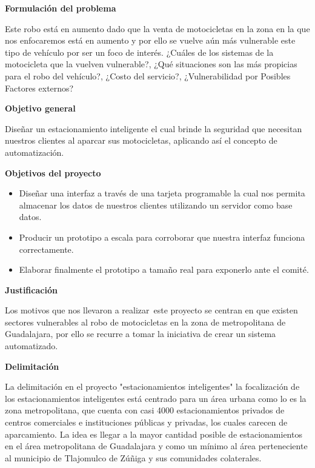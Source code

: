 \documentclass[12pt]{article}
\begin{document}
\textbf{Formulación del problema}\par

Este robo está en aumento dado que la venta de motocicletas en la zona en la que nos enfocaremos está en aumento y por ello se vuelve aún más vulnerable este tipo de vehículo por ser un foco de interés. ¿Cuáles de los sistemas de la motocicleta que la vuelven vulnerable?, ¿Qué situaciones son las más propicias para el robo del vehículo?, ¿Costo del servicio?, ¿Vulnerabilidad por Posibles Factores externos?\par

\textbf{Objetivo general }\par

Diseñar un estacionamiento inteligente el cual brinde la seguridad que necesitan nuestros clientes al aparcar sus motocicletas, aplicando así el concepto de automatización. \par

\textbf{Objetivos del proyecto}\par

\begin{itemize}
	\item Diseñar una interfaz a través de una tarjeta programable la cual nos permita almacenar los datos de nuestros clientes utilizando un servidor como base datos. \par

	\item Producir un prototipo a escala para corroborar que nuestra interfaz funciona correctamente. \par

	\item Elaborar finalmente el prototipo a tamaño real para exponerlo ante el comité. 
\end{itemize}\par

\textbf{Justificación}\par

Los motivos que nos llevaron a realizar\ este proyecto se centran en que existen sectores vulnerables al robo de motocicletas en la zona de metropolitana de Guadalajara, por ello se recurre a tomar la iniciativa de crear un sistema automatizado.  \par

\textbf{Delimitación}\par

La delimitación en el proyecto "estacionamientos inteligentes" la focalización de los estacionamientos inteligentes está centrado para un área urbana como lo es la zona metropolitana, que cuenta con casi 4000 estacionamientos privados de centros comerciales e instituciones públicas y privadas, los cuales carecen de aparcamiento. La idea es llegar a la mayor cantidad posible de estacionamientos en el área metropolitana de Guadalajara y como un mínimo al área perteneciente al municipio de Tlajomulco de Zúñiga y sus comunidades colaterales.\par
\end{document}
